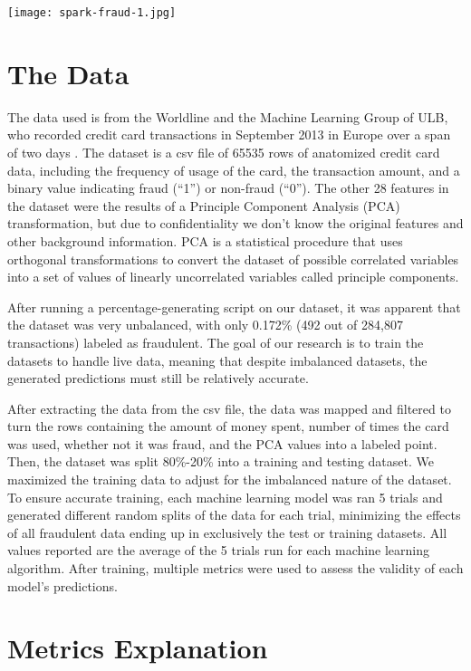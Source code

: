 \documentclass[9pt,twocolumn,twoside]{idsi}
\begin{document}
\texttt{[image: spark-fraud-1.jpg]}

\section{The Data}
The data used is from the Worldline and the Machine Learning Group of ULB, who recorded  credit card transactions in September 2013 in Europe over a span of two days \cite{dal2015calibrating}. The dataset is a csv file of 65535 rows of anatomized credit card data, including the frequency of usage of the card, the transaction amount, and a binary value indicating fraud (“1”) or non-fraud (“0”). The other 28 features in the dataset were the results of a Principle Component Analysis (PCA) transformation, but due to confidentiality we don't know the original features and other background information. PCA is a statistical procedure that uses orthogonal transformations to convert the dataset of possible correlated variables into a set of values of linearly uncorrelated variables called principle components.

After running a percentage-generating script on our dataset, it was apparent that the dataset was very unbalanced, with only 0.172\% (492  out of 284,807 transactions) labeled as fraudulent. The goal of our research is to train the datasets to handle live data, meaning that despite imbalanced datasets, the generated predictions must still be relatively accurate. 

After extracting the data from the csv file, the data was mapped and filtered to turn the rows containing the amount of money spent, number of times the card was used, whether not it was fraud, and the PCA values into a labeled point. Then, the dataset was split 80\%-20\% into a training and testing dataset. We maximized the training data to adjust for the imbalanced nature of the dataset. To ensure accurate training, each machine learning model was ran 5 trials and generated different random splits of the data for each trial, minimizing the effects of all fraudulent data ending up in exclusively the test or training datasets. All values reported are the average of the 5 trials run for each machine learning algorithm. After training, multiple metrics were used to assess the validity of each model's predictions.

\section{Metrics Explanation}
\end{document}
